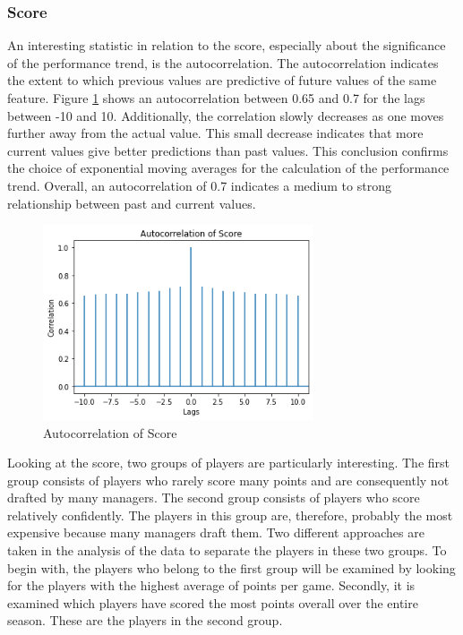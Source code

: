 \subsubsection{Score}

An interesting statistic in relation to the score, especially about the significance of the performance trend, is the autocorrelation. The autocorrelation indicates the extent to which previous values are predictive of future values of the same feature. Figure \ref{fig:autocorrelation_score} shows an autocorrelation between 0.65 and 0.7 for the lags between -10 and 10. Additionally, the correlation slowly decreases as one moves further away from the actual value. This small decrease indicates that more current values give better predictions than past values. This conclusion confirms the choice of exponential moving averages for the calculation of the performance trend. Overall, an autocorrelation of 0.7 indicates a medium to strong relationship between past and current values.

\begin{figure}[H]
    \centering
    \includegraphics[width=8cm]{chapter/4_implementation/section/2_data/section/figures/autocorrelation_score.png}
    \captionsetup{justification=centering}
    \caption{Autocorrelation of Score}
    \label{fig:autocorrelation_score}
\end{figure}

Looking at the score, two groups of players are particularly interesting. The first group consists of players who rarely score many points and are consequently not drafted by many managers. The second group consists of players who score relatively confidently. The players in this group are, therefore, probably the most expensive because many managers draft them. Two different approaches are taken in the analysis of the data to separate the players in these two groups. To begin with, the players who belong to the first group will be examined by looking for the players with the highest average of points per game. Secondly, it is examined which players have scored the most points overall over the entire season. These are the players in the second group.


